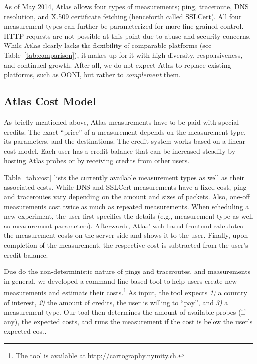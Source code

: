As of May 2014, Atlas allows four types of measurements; ping, traceroute, DNS
resolution, and X.509 certificate fetching (henceforth called SSLCert).  All
four measurement types can further be parameterized for more fine-grained
control.  HTTP requests are not possible at this point due to abuse and
security concerns.  While Atlas clearly lacks the flexibility of comparable
platforms (see Table~\ref{tab:comparison}), it makes up for it with high
diversity, responsiveness, and continued growth.  After all, we do not expect
Atlas to replace existing platforms, such as OONI, but rather to
\emph{complement} them.


\subsection{Atlas Cost Model}

As briefly mentioned above, Atlas measurements have to be paid with special
credits.  The exact ``price'' of a measurement depends on the measurement type,
its parameters, and the destinations.  The credit system works based on a
linear cost model.  Each user has a credit balance that can be increased
steadily by hosting Atlas probes or by receiving credits from other users.

Table~\ref{tab:cost} lists the currently available measurement types as well as
their associated costs.  While DNS and SSLCert measurements have a fixed cost,
ping and traceroutes vary depending on the amount and sizes of packets.  Also,
one-off measurements cost twice as much as repeated measurements.  When
scheduling a new experiment, the user first specifies the details (e.g.,
measurement type as well as measurement parameters).  Afterwards, Atlas'
web-based frontend calculates the measurement costs on the server side and
shows it to the user.  Finally, upon completion of the measurement, the
respective cost is subtracted from the user's credit balance.

Due do the non-deterministic nature of pings and traceroutes, and measurements
in general, we developed a command-line based tool to help users create new
measurements and estimate their costs.\footnote{The tool is available at
\url{http://cartography.nymity.ch}.}  As input, the tool expects \emph{1)}
a country of interest, \emph{2)} the amount of credits, the user is willing
to ``pay'', and \emph{3)} a measurement type.  Our tool then determines the
amount of available probes (if any), the expected costs, and runs the
measurement if the cost is below the user's expected cost.

